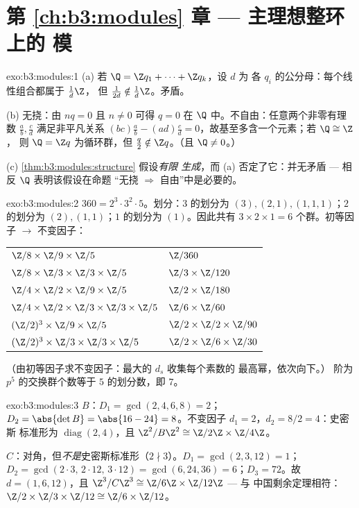 \section*{第 \ref{ch:b3:modules} 章 --- 主理想整环上的
模}

\begin{solution}{exo:b3:modules:1}
(a) 若 $\Q = \Z q_1 + \dots + \Z q_k$，设 $d$ 为
各 $q_i$ 的公分母：每个线性组合都属于 $\frac1d\Z$，
但 $\frac1{2d} \notin \frac1d\Z$。矛盾。

(b) 无挠：由 $nq = 0$ 且 $n \neq 0$ 可得 $q = 0$
在 $\Q$ 中。不自由：任意两个非零有理数 $\frac ab, \frac cd$
满足非平凡关系 $(bc)\frac ab - (ad)\frac cd =
0$，故基至多含一个元素；若 $\Q \cong \Z$，
则 $\Q = \Z q$ 为循环群，但 $\frac q2 \notin \Z q$。（且 $\Q \neq
0$。）

(c) \cref{thm:b3:modules:structure} 假设\emph{有限
生成}，而 (a) 否定了它：并无矛盾 --- 相反 $\Q$
表明该假设在命题
“无挠 $\Rightarrow$ 自由”中是必要的。
\end{solution}

\begin{solution}{exo:b3:modules:2}
$360 = 2^3\cdot3^2\cdot5$。划分：$3$ 的划分为 $(3), (2,1),
(1,1,1)$；$2$ 的划分为 $(2), (1,1)$；$1$ 的划分为 $(1)$。因此共有 $3 \times 2
\times 1 = 6$ 个群。初等因子 $\to$
不变因子：
\begin{center}
\begin{tabular}{l l}
$\Z/8 \times \Z/9 \times \Z/5$ & $\Z/360$\\
$\Z/8 \times \Z/3 \times \Z/3 \times \Z/5$ & $\Z/3 \times
\Z/120$\\
$\Z/4 \times \Z/2 \times \Z/9 \times \Z/5$ & $\Z/2 \times
\Z/180$\\
$\Z/4 \times \Z/2 \times \Z/3 \times \Z/3 \times \Z/5$ & $\Z/6
\times \Z/60$\\
$(\Z/2)^3 \times \Z/9 \times \Z/5$ & $\Z/2 \times \Z/2 \times
\Z/90$\\
$(\Z/2)^3 \times \Z/3 \times \Z/3 \times \Z/5$ & $\Z/2 \times
\Z/6 \times \Z/30$
\end{tabular}
\end{center}
（由初等因子求不变因子：最大的 $d_s$ 收集每个素数的
最高幂，依次向下。）
阶为 $p^5$ 的交换群个数等于 $5$ 的划分数，即 $7$。
\end{solution}

\begin{solution}{exo:b3:modules:3}
$B$：$D_1 = \gcd(2,4,6,8) = 2$；$D_2 = \abs{\det B} = \abs{16 -
24} = 8$。不变因子 $d_1 = 2$，$d_2 = 8/2 = 4$：史密斯
标准形为 $\operatorname{diag}(2, 4)$，且 $\Z^2/B\Z^2 \cong \Z/2\Z
\times \Z/4\Z$。

$C$：对角，但\emph{不是}史密斯标准形（$2 \nmid 3$）。$D_1 =
\gcd(2,3,12) = 1$；$D_2 = \gcd(2\cdot3,\, 2\cdot12,\, 3\cdot12) =
\gcd(6, 24, 36) = 6$；$D_3 = 72$。故 $d = (1, 6, 12)$，且
$\Z^3/C\Z^3 \cong \Z/6\Z\times\Z/12\Z$ --- 与
中国剩余定理相符：$\Z/2\times\Z/3\times\Z/12 \cong \Z/6\times\Z/12$。
\end{solution}


